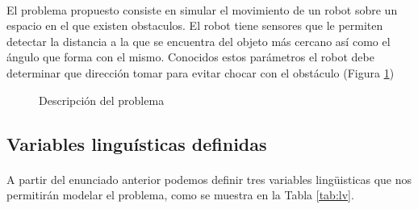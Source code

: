 \documentclass[a4paper,10pt]{article}
\begin{document}
  \paragraph{}   El problema propuesto consiste en simular el movimiento de un robot sobre un espacio en el que existen obstaculos.
  El robot tiene sensores que le permiten detectar la distancia a la que se encuentra del objeto más cercano así como el ángulo que forma
  con el mismo. Conocidos estos parámetros el robot debe determinar que dirección tomar para evitar chocar con el obstáculo (Figura \ref{fig:problem})
  
	\begin{figure}[htb]%
		\begin{center}
			\setlength\fboxsep{0pt}
			\setlength\fboxrule{1.5pt}
		\end{center}
		\caption{Descripción del problema \label{fig:problem}}%
	\end{figure}

\subsection{Variables linguísticas definidas}\label{sub:variables}
\paragraph{}A partir del enunciado anterior podemos definir tres variables lingüisticas que nos permitirán modelar el problema, como se muestra en la Tabla \ref{tab:lv}.
\end{document}
